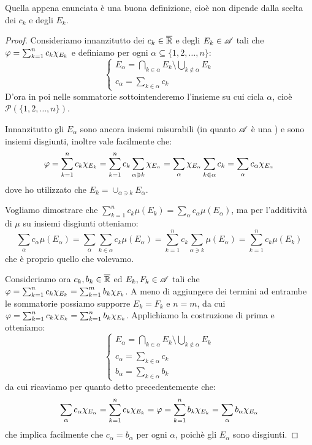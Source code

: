 \begin{remark}\label{BuonaDefIntSemp}
	Quella appena enunciata è una buona definizione, cioè non dipende dalla scelta dei $c_k$ e degli $E_k$.
\end{remark}
\begin{proof}
	Consideriamo innanzitutto dei $c_k\in \overline{\mathbb R}$ e degli $E_k\in \mathscr A$ tali che $\varphi=\sum_{k=1}^nc_k\chi_{E_k}$ e definiamo per ogni $\alpha\subseteq\{1,2,\dots,n\}$:
	\begin{equation*}
		\begin{cases}
			E_\alpha=\bigcap_{k\in\alpha}E_k\setminus \bigcup_{k\not\in \alpha} E_k\\
			c_\alpha=\sum_{k\in\alpha} c_k
		\end{cases}
	\end{equation*}
	D'ora in poi nelle sommatorie sottointenderemo l'insieme su cui cicla $\alpha$, cioè $\mathcal{P}(\{1,2,\dots,n\})$.
	
	Innanzitutto gli $E_\alpha$ sono ancora insiemi misurabili (in quanto $\mathscr A$ è una \sigalg{}) e sono insiemi disgiunti, inoltre vale facilmente che:
	\begin{equation*}
		\varphi=\sum_{k=1}^nc_k\chi_{E_k}=\sum_{k=1}^nc_k\sum_{\alpha\ni k}\chi_{E_\alpha}=\sum_\alpha \chi_{E_\alpha}\sum_{k\in\alpha}c_k=\sum_\alpha c_\alpha\chi_{E_\alpha}
	\end{equation*}
	dove ho utilizzato che $E_k=\cup_{\alpha\ni k} E_\alpha$.

	Vogliamo dimostrare che $\sum_{k=1}^nc_k\mu(E_k)=\sum_{\alpha}c_\alpha\mu(E_\alpha)$, ma per l'additività di $\mu$ su insiemi disgiunti otteniamo:
	\begin{equation}\label{RaffinamentoIntegrale}
		\sum_\alpha c_\alpha\mu(E_\alpha)=\sum_\alpha \sum_{k\in\alpha}c_k\mu(E_\alpha)=\sum_{k=1}^n c_k\sum_{\alpha \ni k} \mu(E_\alpha)=\sum_{k=1}^n c_k \mu(E_k)
	\end{equation}
	che è proprio quello che volevamo.
	
	Consideriamo ora $c_k, b_k\in\overline{\mathbb R}$ ed $E_k,F_k\in\mathscr A$ tali che $\varphi=\sum_{k=1}^nc_k\chi_{E_k}=\sum_{k=1}^mb_k\chi_{F_k}$. A meno di aggiungere dei termini ad entrambe le sommatorie possiamo supporre $E_k=F_k$ e $n=m$, da cui $\varphi=\sum_{k=1}^nc_k\chi_{E_k}=\sum_{k=1}^nb_k\chi_{E_k}$. Applichiamo la costruzione di prima e otteniamo:
	\begin{equation*}
		\begin{cases}
			E_\alpha=\bigcap_{k\in\alpha}E_k\setminus \bigcup_{k\not\in \alpha} E_k\\
			c_\alpha=\sum_{k\in\alpha} c_k\\
			b_\alpha=\sum_{k\in\alpha} b_k
		\end{cases}
	\end{equation*}
	da cui ricaviamo per quanto detto precedentemente che:
	\begin{equation}
		\sum_\alpha c_\alpha\chi_{E_\alpha}=\sum_{k=1}^nc_k\chi_{E_k}=\varphi=\sum_{k=1}^nb_k\chi_{E_k}=\sum_\alpha b_\alpha\chi_{E_\alpha}
	\end{equation}
	che implica facilmente che $c_\alpha=b_\alpha$ per ogni $\alpha$, poichè gli $E_\alpha$ sono disgiunti.
	

\end{proof}
